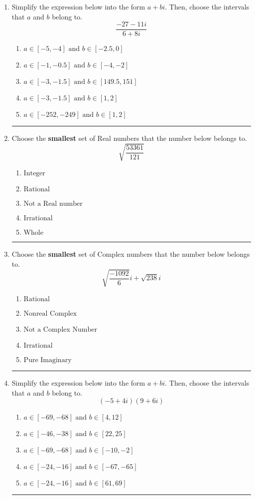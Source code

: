 \documentclass[14pt]{extbook}
\newcommand{\litem}[1]{\item#1\hspace*{-1cm}\rule{\textwidth}{0.4pt}}
\begin{document}
\begin{enumerate}
\litem{
Simplify the expression below into the form $a+bi$. Then, choose the intervals that $a$ and $b$ belong to.\[ \frac{-27 - 11 i}{6 + 8 i} \]\begin{enumerate}[label=\Alph*.]
\item \( a \in [-5, -4] \text{ and } b \in [-2.5, 0] \)
\item \( a \in [-1, -0.5] \text{ and } b \in [-4, -2] \)
\item \( a \in [-3, -1.5] \text{ and } b \in [149.5, 151] \)
\item \( a \in [-3, -1.5] \text{ and } b \in [1, 2] \)
\item \( a \in [-252, -249] \text{ and } b \in [1, 2] \)

\end{enumerate} }
\litem{
Choose the \textbf{smallest} set of Real numbers that the number below belongs to.\[ \sqrt{\frac{53361}{121}} \]\begin{enumerate}[label=\Alph*.]
\item \( \text{Integer} \)
\item \( \text{Rational} \)
\item \( \text{Not a Real number} \)
\item \( \text{Irrational} \)
\item \( \text{Whole} \)

\end{enumerate} }
\litem{
Choose the \textbf{smallest} set of Complex numbers that the number below belongs to.\[ \sqrt{\frac{-1092}{6}} i+\sqrt{238}i \]\begin{enumerate}[label=\Alph*.]
\item \( \text{Rational} \)
\item \( \text{Nonreal Complex} \)
\item \( \text{Not a Complex Number} \)
\item \( \text{Irrational} \)
\item \( \text{Pure Imaginary} \)

\end{enumerate} }
\litem{
Simplify the expression below into the form $a+bi$. Then, choose the intervals that $a$ and $b$ belong to.\[ (-5 + 4 i)(9 + 6 i) \]\begin{enumerate}[label=\Alph*.]
\item \( a \in [-69, -68] \text{ and } b \in [4, 12] \)
\item \( a \in [-46, -38] \text{ and } b \in [22, 25] \)
\item \( a \in [-69, -68] \text{ and } b \in [-10, -2] \)
\item \( a \in [-24, -16] \text{ and } b \in [-67, -65] \)
\item \( a \in [-24, -16] \text{ and } b \in [61, 69] \)


\end{enumerate}}
\end{enumerate}
\end{document}
